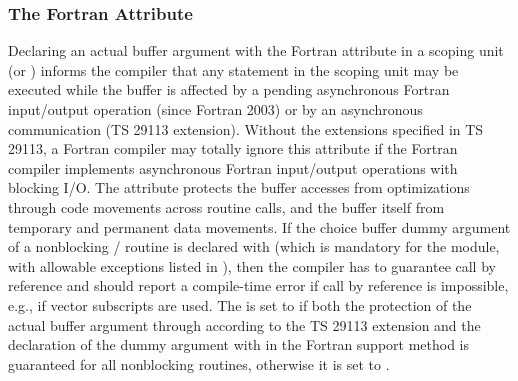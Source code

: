 \subsubsection{The Fortran \texorpdfstring{}{ASYNCHRONOUS}
    Attribute}
\label{sec:f90-problems:asynchronous}

Declaring an actual buffer argument with the 
Fortran attribute in a scoping unit (or )
informs the compiler that any statement in the scoping unit may be executed while the buffer
is affected by a pending asynchronous Fortran input/output operation (since Fortran 2003)
or by an asynchronous communication (TS 29113 extension).
Without the extensions specified in TS 29113, a Fortran compiler may totally ignore this
attribute if the Fortran compiler implements asynchronous Fortran input/output operations
with blocking I/O.
The  attribute protects the buffer accesses
from optimizations through code movements across routine calls,
and the buffer itself from temporary and permanent data movements.
If the choice buffer dummy argument of a nonblocking \MPI/ routine is declared
with 
(which is mandatory for the  module, with allowable exceptions listed in
),
then the compiler has to guarantee call by reference
and should report a compile-time error if call by reference is
impossible, e.g., if vector subscripts are used.
The  is set to 
if both the protection of the actual buffer argument through
 according to the TS 29113 extension
and the declaration of the dummy argument with 
in the Fortran support method is guaranteed for all nonblocking routines,
otherwise it is set to .

